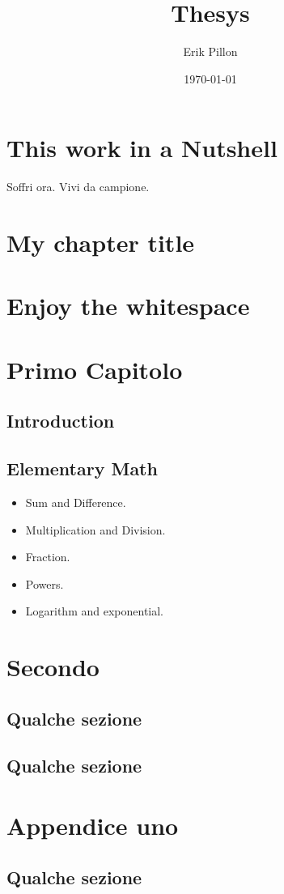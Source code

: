 \documentclass{scrbook}
\author{Erik Pillon}
\title{Thesys}
\date{\today}
\begin{document}
	\frontmatter
	\maketitle
	\tableofcontents
	\chapter*{This work in a Nutshell}
	\mainmatter
	\begin{savequote}
	Soffri ora. Vivi da campione.	
	\end{savequote}
		\chapter{My chapter title}
		\lipsum[5-8]
	\chapter{Enjoy the whitespace}
	\lipsum[5-8]
	\chapter{Primo Capitolo}
	\section{Introduction}
	\lipsum[5]
	\section{Elementary Math}
	\begin{itemize}
		\item Sum and Difference.
		\item Multiplication and Division.
		\item Fraction.
		\item Powers.
		\item Logarithm and exponential.
	\end{itemize}
	\chapter{Secondo}
	\section{Qualche sezione}
	\lipsum[5]
	\section{Qualche sezione}
	\lipsum[5]
	\backmatter
	\appendix
	\chapter{Appendice uno}
	\section{Qualche sezione}
	\lipsum[5]
\end{document}
